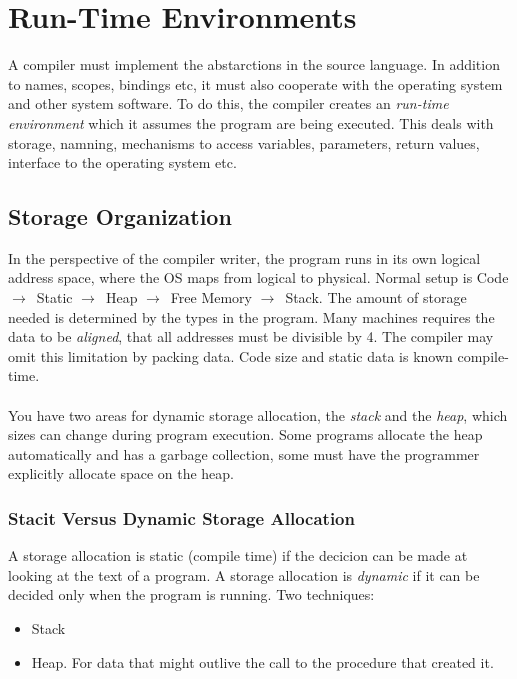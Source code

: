 \documentclass{article}
\newcommand{\ta}{$\to$~}
\begin{document}
\section{Run-Time Environments} %
\label{sec:Run-Time Environments}
A compiler must implement the abstarctions in the source language. In addition to names, scopes, bindings etc, it must also cooperate with the operating system and other system software. To do this, the compiler creates an \emph{run-time environment} which it assumes the program are being executed. This deals with storage, namning, mechanisms to access variables, parameters, return values, interface to the operating system etc.

\subsection{Storage Organization} %
\label{sub:Storage Organization}
In the perspective of the compiler writer, the program runs in its own logical address space, where the OS maps from logical to physical. Normal setup is Code \ta Static \ta Heap \ta Free Memory \ta Stack. The amount of storage needed is determined by the types in the program. Many machines requires the data to be \emph{aligned}, that all addresses must be divisible by 4. The compiler may omit this limitation by packing data. Code size and static data is known compile-time.\\
\\
You have two areas for dynamic storage allocation, the \emph{stack} and the \emph{heap}, which sizes can change during program execution. Some programs allocate the heap automatically and has a garbage collection, some must have the programmer explicitly allocate space on the heap.

\subsubsection{Stacit Versus Dynamic Storage Allocation} %
\label{ssub:Stacit Versus Dynamic Storage Allocation}
A storage allocation is static (compile time) if the decicion can be made at looking at the text of a program. A storage allocation is \emph{dynamic} if it can be decided only when the program is running. Two techniques:
\begin{itemize}
	\item Stack
	\item Heap. For data that might outlive the call to the procedure that created it.
\end{itemize}
\end{document}

